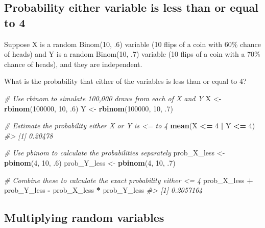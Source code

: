 \documentclass[]{article}
\newenvironment{Shaded}{\begin{snugshade}}{\end{snugshade}}
\newcommand{\CommentTok}[1]{\textcolor[rgb]{0.56,0.35,0.01}{\textit{#1}}}
\newcommand{\DecValTok}[1]{\textcolor[rgb]{0.00,0.00,0.81}{#1}}
\newcommand{\FloatTok}[1]{\textcolor[rgb]{0.00,0.00,0.81}{#1}}
\newcommand{\KeywordTok}[1]{\textcolor[rgb]{0.13,0.29,0.53}{\textbf{#1}}}
\newcommand{\NormalTok}[1]{#1}
\newcommand{\OperatorTok}[1]{\textcolor[rgb]{0.81,0.36,0.00}{\textbf{#1}}}
\newcommand{\StringTok}[1]{\textcolor[rgb]{0.31,0.60,0.02}{#1}}
\begin{document}
\hypertarget{probability-either-variable-is-less-than-or-equal-to-4}{%
\subsection{Probability either variable is less than or equal to
4}\label{probability-either-variable-is-less-than-or-equal-to-4}}

Suppose X is a random Binom(10, .6) variable (10 flips of a coin with
60\% chance of heads) and Y is a random Binom(10, .7) variable (10 flips
of a coin with a 70\% chance of heads), and they are independent.

What is the probability that either of the variables is less than or
equal to 4?

\begin{Shaded}
\begin{Highlighting}[]
\CommentTok{# Use rbinom to simulate 100,000 draws from each of X and Y}
\NormalTok{X <-}\StringTok{ }\KeywordTok{rbinom}\NormalTok{(}\DecValTok{100000}\NormalTok{, }\DecValTok{10}\NormalTok{, }\FloatTok{.6}\NormalTok{)}
\NormalTok{Y <-}\StringTok{ }\KeywordTok{rbinom}\NormalTok{(}\DecValTok{100000}\NormalTok{, }\DecValTok{10}\NormalTok{, }\FloatTok{.7}\NormalTok{)}

\CommentTok{# Estimate the probability either X or Y is <= to 4}
\KeywordTok{mean}\NormalTok{(X }\OperatorTok{<=}\StringTok{ }\DecValTok{4} \OperatorTok{|}\StringTok{ }\NormalTok{Y }\OperatorTok{<=}\StringTok{ }\DecValTok{4}\NormalTok{)}
\CommentTok{#> [1] 0.20478}

\CommentTok{# Use pbinom to calculate the probabilities separately}
\NormalTok{prob_X_less <-}\StringTok{ }\KeywordTok{pbinom}\NormalTok{(}\DecValTok{4}\NormalTok{, }\DecValTok{10}\NormalTok{, }\FloatTok{.6}\NormalTok{)}
\NormalTok{prob_Y_less <-}\StringTok{ }\KeywordTok{pbinom}\NormalTok{(}\DecValTok{4}\NormalTok{, }\DecValTok{10}\NormalTok{, }\FloatTok{.7}\NormalTok{)}

\CommentTok{# Combine these to calculate the exact probability either <= 4}
\NormalTok{prob_X_less }\OperatorTok{+}\StringTok{ }\NormalTok{prob_Y_less }\OperatorTok{-}\StringTok{ }\NormalTok{prob_X_less }\OperatorTok{*}\StringTok{ }\NormalTok{prob_Y_less}
\CommentTok{#> [1] 0.2057164}
\end{Highlighting}
\end{Shaded}

\hypertarget{multiplying-random-variables}{%
\subsection{Multiplying random
variables}\label{multiplying-random-variables}}
\end{document}
